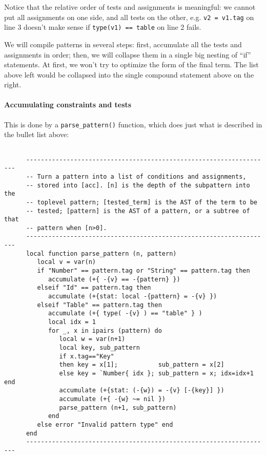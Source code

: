 Notice that the relative order of tests and assignments is meaningful:
we cannot put all assignments on one side, and all tests on the
other, e.g. \verb|v2 = v1.tag| on line 3 doesn't make sense if
\verb|type(v1) == table| on line 2 fails.

We will compile patterns in several steps: first, accumulate all the
tests and assignments in order; then, we will collapse them in a
single big nesting of ``if'' statements. At first, we won't try
to optimize the form of the final term. The list above left would be
collapsed into the single compound statement above on the right.

\paragraph{Accumulating constraints and tests}
This is done by a \verb|parse_pattern()| function, which does just what
is described in the bullet list above:

\begin{Verbatim}[fontsize=\scriptsize]

      -------------------------------------------------------------------
      -- Turn a pattern into a list of conditions and assignments,
      -- stored into [acc]. [n] is the depth of the subpattern into the
      -- toplevel pattern; [tested_term] is the AST of the term to be 
      -- tested; [pattern] is the AST of a pattern, or a subtree of that
      -- pattern when [n>0].
      -------------------------------------------------------------------
      local function parse_pattern (n, pattern)
         local v = var(n)
         if "Number" == pattern.tag or "String" == pattern.tag then
            accumulate (+{ -{v} == -{pattern} })
         elseif "Id" == pattern.tag then
            accumulate (+{stat: local -{pattern} = -{v} })
         elseif "Table" == pattern.tag then
            accumulate (+{ type( -{v} ) == "table" } )
            local idx = 1
            for _, x in ipairs (pattern) do
               local w = var(n+1)
               local key, sub_pattern
               if x.tag=="Key" 
               then key = x[1];           sub_pattern = x[2]
               else key = `Number{ idx }; sub_pattern = x; idx=idx+1 end
               accumulate (+{stat: (-{w}) = -{v} [-{key}] })
               accumulate (+{ -{w} ~= nil })
               parse_pattern (n+1, sub_pattern)
            end
         else error "Invalid pattern type" end
      end
      -------------------------------------------------------------------
\end{Verbatim}

